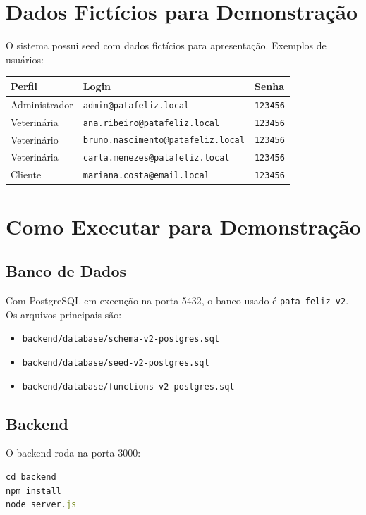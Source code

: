 \documentclass[12pt,a4paper]{article}
\begin{document}
\section{Dados Fictícios para Demonstração}

O sistema possui seed com dados fictícios para apresentação. Exemplos de usuários:

\begin{longtable}{p{4cm}p{6cm}p{3cm}}
\toprule
\textbf{Perfil} & \textbf{Login} & \textbf{Senha} \\
\midrule
Administrador & \texttt{admin@patafeliz.local} & \texttt{123456} \\
Veterinária & \texttt{ana.ribeiro@patafeliz.local} & \texttt{123456} \\
Veterinário & \texttt{bruno.nascimento@patafeliz.local} & \texttt{123456} \\
Veterinária & \texttt{carla.menezes@patafeliz.local} & \texttt{123456} \\
Cliente & \texttt{mariana.costa@email.local} & \texttt{123456} \\
\bottomrule
\end{longtable}

\section{Como Executar para Demonstração}

\subsection{Banco de Dados}

Com PostgreSQL em execução na porta 5432, o banco usado é \texttt{pata\_feliz\_v2}. Os arquivos principais são:

\begin{itemize}[leftmargin=*]
  \item \texttt{backend/database/schema-v2-postgres.sql}
  \item \texttt{backend/database/seed-v2-postgres.sql}
  \item \texttt{backend/database/functions-v2-postgres.sql}
\end{itemize}

\subsection{Backend}

O backend roda na porta 3000:

\begin{lstlisting}[style=codigo,language=JavaScript,caption={Execução do backend}]
cd backend
npm install
node server.js
\end{lstlisting}
\end{document}
